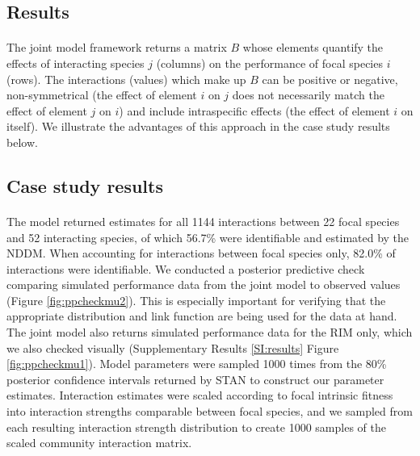 \documentclass[a4,12pt]{article}
\begin{document}
\begin{refsection}
\section{Results}
    
    \paragraph{}
    The joint model framework returns a matrix $B$ whose elements quantify the effects of interacting species $j$ (columns) on the performance of focal species $i$ (rows). The interactions (values) which make up $B$ can be positive or negative, non-symmetrical (the effect of element $i$ on $j$ does not necessarily match the effect of element $j$ on $i$) and include intraspecific effects (the effect of element $i$ on itself). We illustrate the advantages of this approach in the case study results below. 


    \subsection{Case study results}

    \paragraph{}
    The model returned estimates for all 1144 interactions between 22 focal species and 52 interacting species, of which 56.7\% were identifiable and estimated by the NDDM. When accounting for interactions between focal species only, 82.0\% of interactions were identifiable. We conducted a posterior predictive check comparing simulated performance data from the joint model to observed values (Figure \ref{fig:ppcheckmu2}). This is especially important for verifying that the appropriate distribution and link function are being used for the data at hand. The joint model also returns simulated performance data for the RIM only, which we also checked visually (Supplementary Results \ref{SI:results} Figure \ref{fig:ppcheckmu1}). Model parameters were sampled 1000 times from the 80\% posterior confidence intervals returned by STAN to construct our parameter estimates. Interaction estimates were scaled according to focal intrinsic fitness into interaction strengths comparable between focal species, and we sampled from each resulting interaction strength distribution to create 1000 samples of the scaled community interaction matrix.


\end{refsection}
\end{document}
